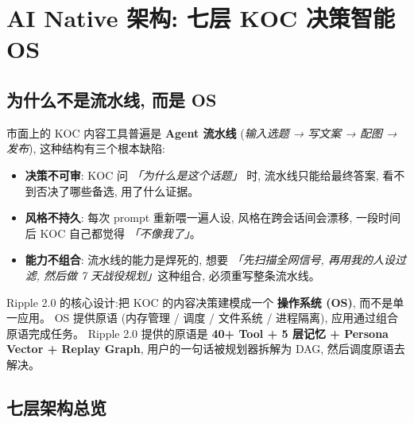 \section{AI Native 架构: 七层 KOC 决策智能 OS}

\subsection{为什么不是流水线, 而是 OS}

市面上的 KOC 内容工具普遍是\textbf{ Agent 流水线} (\textit{输入选题 → 写文案 → 配图 → 发布}), 这种结构有三个根本缺陷:

\begin{itemize}
    \item \textbf{决策不可审}: KOC 问 \textit{「为什么是这个话题」} 时, 流水线只能给最终答案, 看不到否决了哪些备选, 用了什么证据。
    \item \textbf{风格不持久}: 每次 prompt 重新喂一遍人设, 风格在跨会话间会漂移, 一段时间后 KOC 自己都觉得 \textit{「不像我了」}。
    \item \textbf{能力不组合}: 流水线的能力是焊死的, 想要 \textit{「先扫描全网信号, 再用我的人设过滤, 然后做 7 天战役规划」}这种组合, 必须重写整条流水线。
\end{itemize}

\begin{insight}
Ripple 2.0 的核心设计:把 KOC 的内容决策建模成一个 \textbf{操作系统 (OS)}, 而不是单一应用。
OS 提供原语 (内存管理 / 调度 / 文件系统 / 进程隔离), 应用通过组合原语完成任务。
Ripple 2.0 提供的原语是 \textbf{40+ Tool + 5 层记忆 + Persona Vector + Replay Graph}, 用户的一句话被规划器拆解为 DAG, 然后调度原语去解决。
\end{insight}

\subsection{七层架构总览}

